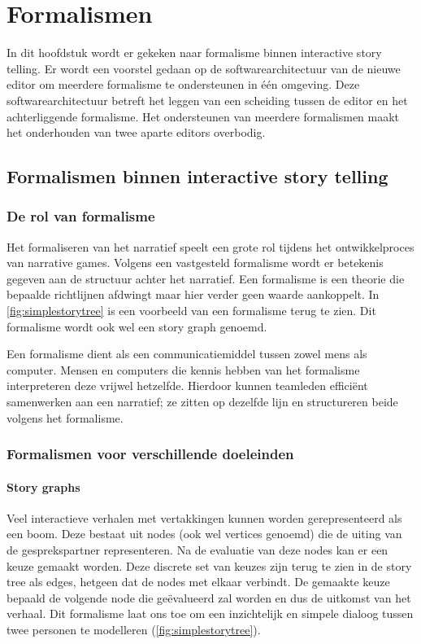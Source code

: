 \chapter{Formalismen}
\label{ch:formalism}
In dit hoofdstuk wordt er gekeken naar formalisme binnen interactive story telling. Er wordt een voorstel gedaan op de softwarearchitectuur van de nieuwe editor om meerdere formalisme te ondersteunen in één omgeving. Deze softwarearchitectuur betreft het leggen van een scheiding tussen de editor en het achterliggende formalisme. Het ondersteunen van meerdere formalismen maakt het onderhouden van twee aparte editors overbodig.

\section{Formalismen binnen interactive story telling}
\subsection{De rol van formalisme}
Het formaliseren van het narratief speelt een grote rol tijdens het ontwikkelproces van narrative games. Volgens een vastgesteld formalisme wordt er betekenis gegeven aan de structuur achter het narratief. Een formalisme is een theorie die bepaalde richtlijnen afdwingt maar hier verder geen waarde aankoppelt. In \autoref{fig:simplestorytree} is een voorbeeld van een formalisme terug te zien. Dit formalisme wordt ook wel een story graph genoemd.

Een formalisme dient als een communicatiemiddel tussen zowel mens als computer. Mensen en computers die kennis hebben van het formalisme interpreteren deze vrijwel hetzelfde. Hierdoor kunnen teamleden efficiënt samenwerken aan een narratief; ze zitten op dezelfde lijn en structureren beide volgens het formalisme.

\subsection{Formalismen voor verschillende doeleinden}
\subsubsection{Story graphs}

Veel interactieve verhalen met vertakkingen kunnen worden gerepresenteerd als een boom\cite{GalyeanIII1995}. Deze bestaat uit nodes (ook wel vertices genoemd) die de uiting van de gesprekspartner representeren. Na de evaluatie van deze nodes kan er een keuze gemaakt worden. Deze discrete set van keuzes zijn terug te zien in de story tree als edges, hetgeen dat de nodes met elkaar verbindt. De gemaakte keuze bepaald de volgende node die geëvalueerd zal worden en dus de uitkomst van het verhaal. Dit formalisme laat ons toe om een inzichtelijk en simpele dialoog tussen twee personen te modelleren (\autoref{fig:simplestorytree}).

